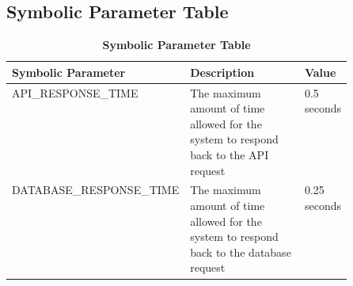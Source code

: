 \documentclass{article}
\begin{document}
\subsection{Symbolic Parameter Table}
\begin{table}[H]
\begin{adjustwidth}{-1in}{-0.5in}
\caption{\bf Symbolic Parameter Table}
\begin{tabular}{|l|p{0.5\linewidth}|l|}
\hline
\multicolumn{1}{|l}{\bfseries Symbolic Parameter} & \multicolumn{1}{|l|}{\bfseries Description} & \multicolumn{1}{l|}{\bfseries Value}\\
\hline
API\_RESPONSE\_TIME & The maximum amount of time allowed for the system to respond back to the API request & 0.5 seconds\\
\hline
DATABASE\_RESPONSE\_TIME & The maximum amount of time allowed for the system to respond back to the database request & 0.25 seconds\\
\hline

\end{tabular}
\end{adjustwidth}
\end{table}


\newpage
\end{document}
